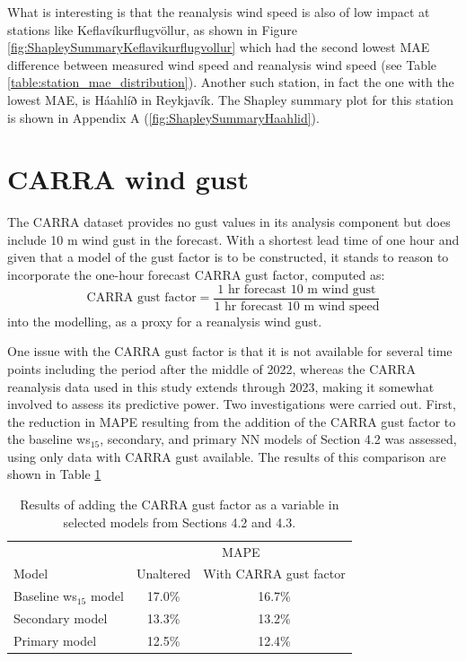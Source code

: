 What is interesting is that the reanalysis wind speed is also of low impact at stations like Keflavíkurflugvöllur, as shown in Figure \ref{fig:ShapleySummaryKeflavikurflugvollur} which had the second lowest MAE difference between measured wind speed and reanalysis wind speed (see Table \ref{table:station_mae_distribution}). Another such station, in fact the one with the lowest MAE, is Háahlíð in Reykjavík. The Shapley summary plot for this station is shown in Appendix A (\ref{fig:ShapleySummaryHaahlid}).

\section{CARRA wind gust}

The CARRA dataset provides no gust values in its analysis component but does include 10 m wind gust in the forecast. With a shortest lead time of one hour and given that a model of the gust factor is to be constructed, it stands to reason to incorporate the one-hour forecast CARRA gust factor, computed as:
\begin{equation*}
\text{CARRA gust factor} = \dfrac
{\text{1 hr forecast 10 m wind gust}}
{\text{1 hr forecast 10 m wind speed}}
\end{equation*}
into the modelling, as a proxy for a reanalysis wind gust.

One issue with the CARRA gust factor is that it is not available for several time points including the period after the middle of 2022, whereas the CARRA reanalysis data used in this study extends through 2023, making it somewhat involved to assess its predictive power. Two investigations were carried out. First, the reduction in MAPE resulting from the addition of the CARRA gust factor to the baseline ws$_{15}$, secondary, and primary NN models of Section 4.2 was assessed, using only data with CARRA gust available. The results of this comparison are shown in Table \ref{table:carra_gust}

\begin{table}[h]
  \centering
  \caption[Results adding CARRA gust factor]{Results of adding the CARRA gust factor as a variable in selected models from Sections 4.2 and 4.3.}
  \label{table:carra_gust}
  \begin{tabular}{lcc}
    \toprule
    & \multicolumn{2}{c}{MAPE\qquad\qquad} \\
    Model & Unaltered & With CARRA gust factor \\
    \midrule
    Baseline ws$_{15}$ model & 17.0\% & 16.7\% \\
    Secondary model           & 13.3\% & 13.2\% \\
    Primary model             & 12.5\% & 12.4\% \\
    \bottomrule
  \end{tabular}
\end{table}

